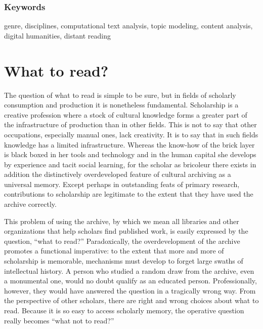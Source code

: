 \documentclass[]{book}
\theoremstyle{definition}
\theoremstyle{definition}
\theoremstyle{definition}
\theoremstyle{remark}
\begin{document}
\hypertarget{keywords}{%
\subsubsection*{Keywords}\label{keywords}}


genre, disciplines, computational text analysis, topic
modeling, content analysis, digital humanities, distant reading

\hypertarget{what-to-read}{%
\section{What to read?}\label{what-to-read}}

The question of what to read is simple to be sure, but in fields of
scholarly consumption and production it is nonetheless fundamental.
Scholarship is a creative profession where a stock of cultural knowledge
forms a greater part of the infrastructure of production than in other
fields. This is not to say that other occupations, especially manual
ones, lack creativity. It is to say that in such fields knowledge has a
limited infrastructure. Whereas the know-how of the brick layer is black
boxed in her tools and technology and in the human capital she develops
by experience and tacit social learning, for the scholar as bricoleur
there exists in addition the distinctively overdeveloped feature of
cultural archiving as a universal memory. Except perhaps in outstanding
feats of primary research, contributions to scholarship are legitimate
to the extent that they have used the archive correctly.

This problem of using the archive, by which we mean all libraries and
other organizations that help scholars find published work, is easily
expressed by the question, ``what to read?'' Paradoxically, the
overdevelopment of the archive promotes a functional imperative: to the
extent that more and more of scholarship is memorable, mechanisms must
develop to forget large swaths of intellectual history. A person who
studied a random draw from the archive, even a monumental one, would no
doubt qualify as an educated person. Professionally, however, they would
have answered the question in a tragically wrong way. From the
perspective of other scholars, there are right and wrong choices about
what to read. Because it is so easy to access scholarly memory, the
operative question really becomes ``what not to read?''
\end{document}
